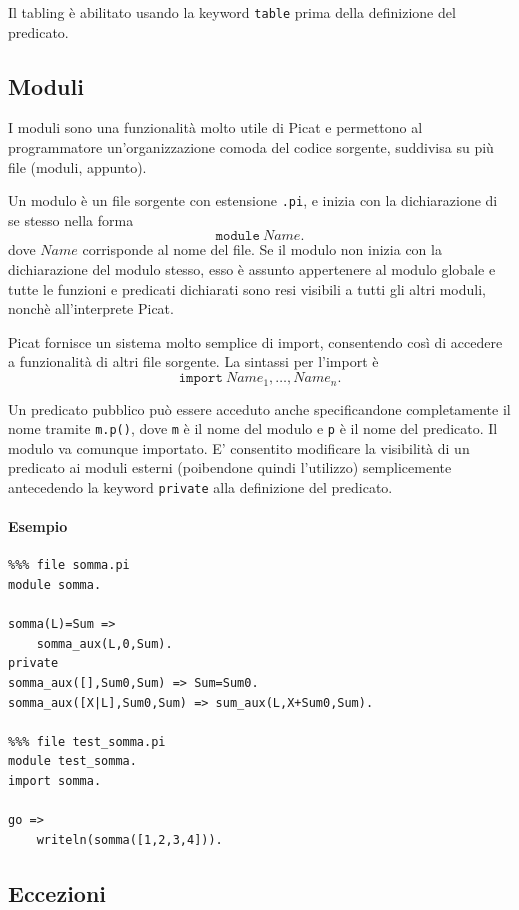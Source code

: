 \documentclass[12pt,a4paper,openright]{book} %
\begin{document}
Il tabling è abilitato usando la keyword \verb|table| prima della
definizione del predicato.

\subsection{Moduli}
\label{subsec:picat_advanced_modules}

I moduli sono una funzionalità molto utile di Picat e permettono al
programmatore un'organizzazione comoda del codice sorgente, suddivisa
su più file (moduli, appunto).

Un modulo è un file sorgente con estensione \texttt{.pi}, e
inizia con la dichiarazione di se stesso nella forma 
\[
\texttt{module}\ Name.
\]
dove $Name$ corrisponde al nome del file. Se il modulo non inizia con
la dichiarazione del modulo stesso, esso è assunto appertenere al
modulo globale e tutte le funzioni e predicati dichiarati sono resi
visibili a tutti gli altri moduli, nonchè all'interprete Picat.

Picat fornisce un sistema molto semplice di import, consentendo così
di accedere a funzionalità di altri file sorgente. La sintassi per
l'import è
\[
\texttt{import}\ Name_1, \ldots, Name_n.
\]

Un predicato pubblico può essere acceduto anche specificandone
completamente il nome tramite \texttt{m.p()}, dove \texttt{m} è il
nome del modulo e \texttt{p} è il nome del predicato. Il modulo va
comunque importato. E' consentito modificare la visibilità di un
predicato ai moduli esterni (poibendone quindi l'utilizzo)
semplicemente antecedendo la keyword \texttt{private} alla definizione
del predicato.

\paragraph{Esempio}

\begin{verbatim}
%%% file somma.pi
module somma.

somma(L)=Sum =>
    somma_aux(L,0,Sum).
private
somma_aux([],Sum0,Sum) => Sum=Sum0.
somma_aux([X|L],Sum0,Sum) => sum_aux(L,X+Sum0,Sum).

%%% file test_somma.pi
module test_somma.
import somma.

go =>
    writeln(somma([1,2,3,4])).
\end{verbatim}

\subsection{Eccezioni}
\label{subsec:picat_advanced_exceptions}
\end{document}
